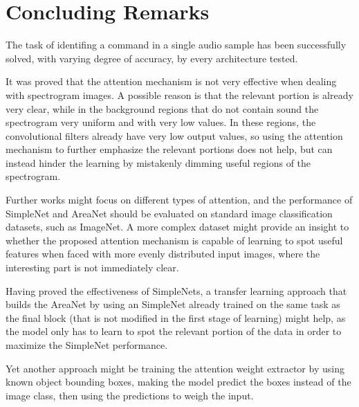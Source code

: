 
\section{Concluding Remarks}
\label{sec:conclusions}

The task of identifing a command in a single audio sample has been successfully
solved, with varying degree of accuracy, by every architecture tested.

%
It was proved that the attention mechanism is not very effective when dealing
with spectrogram images.
%
A possible reason is that the relevant portion is already very clear, while in
the background regions that do not contain sound the spectrogram very uniform
and with very low values.
%
In these regions, the convolutional filters already have very low output
values, so using the attention mechanism to further emphasize the relevant
portions does not help, but can instead hinder the learning by mistakenly
dimming useful regions of the spectrogram.

Further works might focus on different types of attention, and the performance
of SimpleNet and AreaNet should be evaluated on standard image classification
datasets, such as ImageNet.
%
A more complex dataset might provide an insight to whether the proposed
attention mechanism is capable of learning to spot useful features when faced
with more evenly distributed input images, where the interesting part is not
immediately clear.

%
Having proved the effectiveness of SimpleNets, a transfer learning approach
that builds the AreaNet by using an SimpleNet already trained on the same task
as the final block (that is not modified in the first stage of learning) might
help, as the model only has to learn to spot the relevant portion of the data
in order to maximize the SimpleNet performance.

Yet another approach might be training the attention weight extractor by using
known object bounding boxes, making the model predict the boxes instead of the
image class, then using the predictions to weigh the input.


